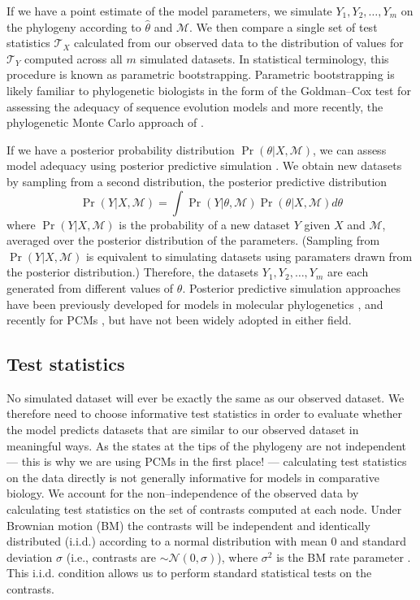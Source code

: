\documentclass[a4paper,11pt]{article}
\begin{document}
If we have a point estimate of the model parameters, we simulate $Y_1, Y_2, \ldots, Y_m$ on the phylogeny according to $\hat{\theta}$ and $\mathcal{M}$. We then compare a single set of test statistics $\mathcal{T}_X$ calculated from our observed data to the distribution of values for $\mathcal{T}_Y$ computed across all $m$ simulated datasets. In statistical terminology, this procedure is known as parametric bootstrapping. Parametric bootstrapping is likely familiar to phylogenetic biologists in the form of the Goldman--Cox test \citep{Goldman} for assessing the adequacy of sequence evolution models and more recently, the phylogenetic Monte Carlo approach of \citet{Boettiger2012}.

If we have a posterior probability distribution $\Pr(\theta|X, \mathcal{M})$, we can assess model adequacy using posterior predictive simulation \citep{Rubin1984, Gelman1996}. We obtain new datasets by sampling from a second distribution, the posterior predictive distribution
\begin{equation}
\Pr(Y|X,\mathcal{M}) = \int \Pr(Y|\theta, \mathcal{M})\Pr(\theta |X,\mathcal{M})d\theta
\end{equation}
where $\Pr(Y|X,\mathcal{M})$ is the probability of a new dataset $Y$ given $X$ and $\mathcal{M}$, averaged over the posterior distribution of the parameters. (Sampling from $\Pr(Y|X,\mathcal{M})$ is equivalent to simulating datasets using paramaters drawn from the posterior distribution.) Therefore, the datasets $Y_1, Y_2, \ldots, Y_m$ are each generated from different values of $\theta$. Posterior predictive simulation approaches have been previously developed for models in molecular phylogenetics \citep{Bollback2002, Reid2013, Lewis2013, Brown2013}, and recently for PCMs \citep{SlaterPennell}, but have not been widely adopted in either field.

\subsection{Test statistics}
No simulated dataset will ever be exactly the same as our observed dataset. We therefore need to choose informative test statistics in order to evaluate whether the model predicts datasets that are similar to our observed dataset in meaningful ways. As the states at the tips of the phylogeny are not independent --- this is why we are using PCMs in the first place! --- calculating test statistics on the data directly is not generally informative for models in comparative biology. We account for the non--independence of the observed data by calculating test statistics on the set of contrasts \citep[i.e., ``phylogenetically independent contrasts'', \emph{sensu}][]{Felsenstein1985} computed at each node. \citep[We refer readers to][for details on how contrasts are calculated.]{Felsenstein1985, Rohlf2001, Blomberg2012} Under Brownian motion (BM) the contrasts will be independent and identically distributed (i.i.d.) according to a normal distribution with mean 0 and standard deviation $\sigma$ (i.e., contrasts are $\sim \mathcal{N}(0, \sigma)$), where $\sigma^2$ is the BM rate parameter \citep{Felsenstein1985}. This i.i.d. condition allows us to perform standard statistical tests on the contrasts. 
\end{document}
